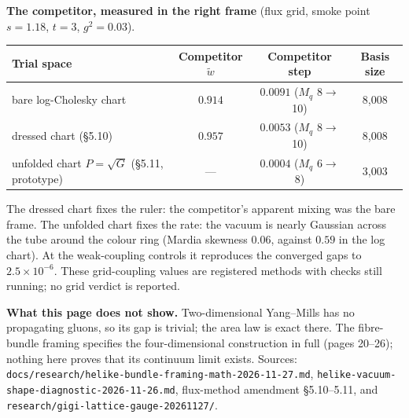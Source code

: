\documentclass[11pt,letterpaper]{article}
\theoremstyle{plain}
\theoremstyle{definition}
\begin{document}
\textbf{The competitor, measured in the right frame} (flux grid, smoke point
$s=1.18$, $t=3$, $g^2=0.03$).
\begin{center}\small
\begin{tabular}{@{}lccc@{}}\toprule
Trial space & Competitor $\tilde w$ & Competitor step & Basis size\\\midrule
bare log-Cholesky chart & $0.914$ & $0.0091$ ($M_q$ 8$\to$10) & 8{,}008\\
dressed chart (\S5.10) & $0.957$ & $0.0053$ ($M_q$ 8$\to$10) & 8{,}008\\
unfolded chart $P=\sqrt G$ (\S5.11, prototype) & --- & $0.0004$ ($M_q$ 6$\to$8) & 3{,}003\\\bottomrule
\end{tabular}
\end{center}
The dressed chart fixes the ruler: the competitor's apparent mixing was the
bare frame. The unfolded chart fixes the rate: the vacuum is nearly Gaussian
across the tube around the colour ring (Mardia skewness $0.06$, against $0.59$
in the log chart). At the weak-coupling controls it reproduces the converged
gaps to $2.5\times10^{-6}$. These grid-coupling values are registered methods
with checks still running; no grid verdict is reported.

{\sloppy\textbf{What this page does not show.} Two-dimensional Yang--Mills has no
propagating gluons, so its gap is trivial; the area law is exact there. The
fibre-bundle framing specifies the four-dimensional construction in full
(pages 20--26); nothing here proves that its continuum limit exists. Sources:
\texttt{docs/research/helike-bundle-framing-math-2026-11-27.md},
\texttt{helike-vacuum-shape-diagnostic-2026-11-26.md}, flux-method amendment
\S5.10--5.11, and \texttt{research/gigi-lattice-gauge-20261127/}.\par}

\newpage







\end{document}
